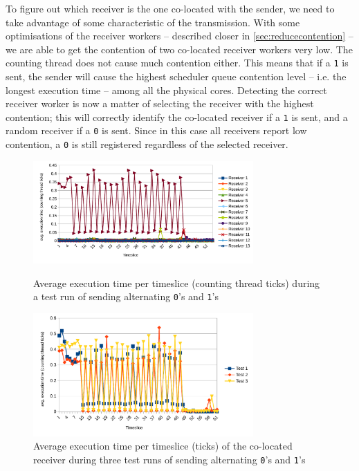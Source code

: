\documentclass[11pt,
  titlepage=false,
  parskip=half,      %
]{scrreprt}
\begin{document}
To figure out which receiver is the one co-located with the sender,
we need to take advantage of some characteristic of the transmission.
With some optimisations of the receiver workers -- described closer in \ref{sec:reducecontention} --
we are able to get the contention of two co-located receiver workers very low.
The counting thread does not cause much contention either.
This means that if a \texttt{1} is sent, the sender will cause the highest scheduler queue contention level -- i.e. the longest execution time --
among all the physical cores.
Detecting the correct receiver worker is now a matter of selecting the receiver with the highest contention;
this will correctly identify the co-located receiver if a \texttt{1} is sent, and a random receiver if a \texttt{0} is sent.
Since in this case all receivers report low contention, a \texttt{0} is still registered regardless of the selected receiver.

\begin{figure}
    \centering
    \includegraphics[width=0.75\textwidth]{figures/contentiontest}

    \caption{Average execution time per timeslice (counting thread ticks) during a test run of sending alternating \texttt{0}'s and \texttt{1}'s}
    \label{fig:contentiontest}
    \centering
    \includegraphics[width=0.75\textwidth]{figures/contentioncoalesced}

    \caption{Average execution time per timeslice (ticks) of the co-located receiver during three test runs of sending alternating \texttt{0}'s and \texttt{1}'s}
    \label{fig:contentioncoalesced}
\end{figure}
\end{document}
